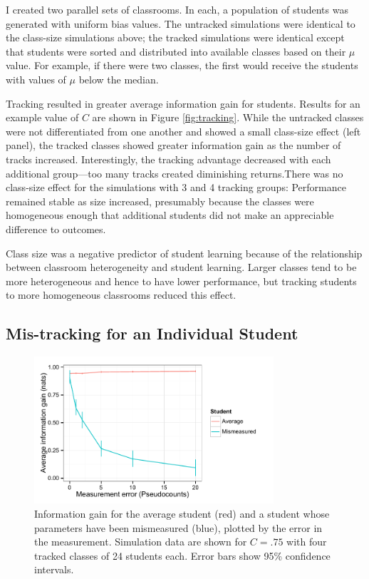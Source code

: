 \documentclass[10pt,letterpaper]{article}
\begin{document}
I created two parallel sets of classrooms. In each, a population of students was generated with uniform bias values. The untracked simulations were identical to the class-size simulations above; the tracked simulations were identical except that students were sorted and distributed into available classes based on their $\mu$ value. For example, if there were two classes, the first would receive the students with values of $\mu$ below the median. 

Tracking resulted in greater average information gain for students. Results for an example value of $C$ are shown in Figure \ref{fig:tracking}. While the untracked classes were not differentiated from one another and showed a small class-size effect (left panel), the tracked classes showed greater information gain as the number of tracks increased. Interestingly, the tracking advantage decreased with each additional group---too many tracks created diminishing returns.There was no class-size effect for the simulations with 3 and 4 tracking groups: Performance remained stable as size increased, presumably because the classes were homogeneous enough that additional students did not make an appreciable difference to outcomes.  

Class size was a negative predictor of student learning because of the relationship between classroom heterogeneity and student learning. Larger classes tend to be more heterogeneous and hence to have lower performance, but tracking students to more homogeneous classrooms reduced this effect.

\subsection{Mis-tracking for an Individual Student}

\begin{figure}[t]
\begin{center}
\includegraphics[width=3.5in]{figures/mismeasured.pdf}
\end{center}
\caption{\label{fig:mismeasure} Information gain for the average student (red) and a student whose parameters have been mismeasured (blue), plotted by the error in the measurement. Simulation data are shown for $C=.75$ with four tracked classes of 24 students each. Error bars show 95\% confidence intervals.}
\end{figure}
\end{document}
